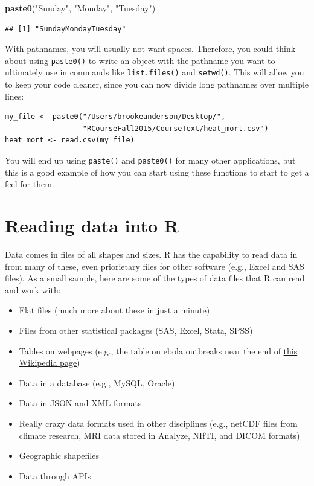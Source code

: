 \documentclass[]{book}
\makeatletter
\newenvironment{Shaded}{\begin{snugshade}}{\end{snugshade}}
\newcommand{\KeywordTok}[1]{\textcolor[rgb]{0.13,0.29,0.53}{\textbf{#1}}}
\newcommand{\StringTok}[1]{\textcolor[rgb]{0.31,0.60,0.02}{#1}}
\newcommand{\NormalTok}[1]{#1}
\providecommand{\tightlist}{%
  \setlength{\itemsep}{0pt}\setlength{\parskip}{0pt}}
\newenvironment{kframe}{%
\medskip{}
\setlength{\fboxsep}{.8em}
 \def\at@end@of@kframe{}%
 \ifinner\ifhmode%
  \def\at@end@of@kframe{\end{minipage}}%
  \begin{minipage}{\columnwidth}%
 \fi\fi%
 \def\FrameCommand##1{\hskip\@totalleftmargin \hskip-\fboxsep
 \colorbox{shadecolor}{##1}\hskip-\fboxsep
     \hskip-\linewidth \hskip-\@totalleftmargin \hskip\columnwidth}%
 \MakeFramed {\advance\hsize-\width
   \@totalleftmargin\z@ \linewidth\hsize
   \@setminipage}}%
 {\par\unskip\endMakeFramed%
 \at@end@of@kframe}
\renewenvironment{Shaded}{\begin{kframe}}{\end{kframe}}
\theoremstyle{definition}
\theoremstyle{definition}
\theoremstyle{definition}
\theoremstyle{remark}
\makeatother
\begin{document}
\begin{Shaded}
\begin{Highlighting}[]
\KeywordTok{paste0}\NormalTok{(}\StringTok{"Sunday"}\NormalTok{, }\StringTok{"Monday"}\NormalTok{, }\StringTok{"Tuesday"}\NormalTok{)}
\end{Highlighting}
\end{Shaded}

\begin{verbatim}
## [1] "SundayMondayTuesday"
\end{verbatim}

With pathnames, you will usually not want spaces. Therefore, you could
think about using \texttt{paste0()} to write an object with the pathname
you want to ultimately use in commands like \texttt{list.files()} and
\texttt{setwd()}. This will allow you to keep your code cleaner, since
you can now divide long pathnames over multiple lines:

\begin{verbatim}
my_file <- paste0("/Users/brookeanderson/Desktop/",
                  "RCourseFall2015/CourseText/heat_mort.csv")
heat_mort <- read.csv(my_file)
\end{verbatim}

You will end up using \texttt{paste()} and \texttt{paste0()} for many
other applications, but this is a good example of how you can start
using these functions to start to get a feel for them.

\section{Reading data into R}\label{reading-data-into-r}

Data comes in files of all shapes and sizes. R has the capability to
read data in from many of these, even priorietary files for other
software (e.g., Excel and SAS files). As a small sample, here are some
of the types of data files that R can read and work with:

\begin{itemize}
\tightlist
\item
  Flat files (much more about these in just a minute)
\item
  Files from other statistical packages (SAS, Excel, Stata, SPSS)
\item
  Tables on webpages (e.g., the table on ebola outbreaks near the end of
  \href{http://en.wikipedia.org/wiki/Ebola_virus_epidemic_in_West_Africa}{this
  Wikipedia page})
\item
  Data in a database (e.g., MySQL, Oracle)
\item
  Data in JSON and XML formats
\item
  Really crazy data formats used in other disciplines (e.g., netCDF
  files from climate research, MRI data stored in Analyze, NIfTI, and
  DICOM formats)
\item
  Geographic shapefiles
\item
  Data through APIs
\end{itemize}
\end{document}

